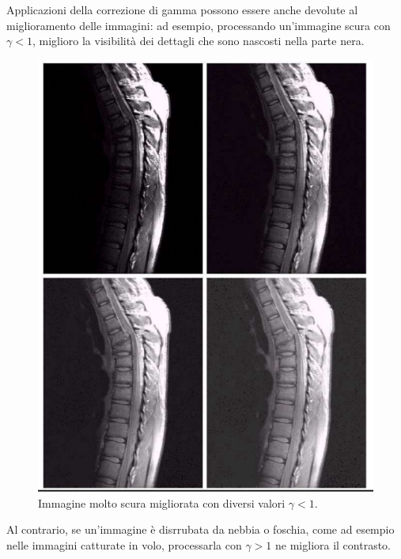 \documentclass[a4paper,11pt]{article}
\begin{document}
Applicazioni della correzione di gamma possono essere anche devolute al miglioramento delle immagini: ad esempio, processando un'immagine scura
con $\gamma < 1$, miglioro la visibilità dei dettagli che sono nascosti nella parte nera.

\renewcommand{\thefigure}{5.10}
\begin{figure}[!h]
  \centering
    \includegraphics[scale=0.5]{images/5/dark_gamma.png}
    \caption{Immagine molto scura migliorata con diversi valori $\gamma < 1$.}
\end{figure}

Al contrario, se un'immagine è disrrubata da nebbia o foschia, come ad esempio nelle immagini catturate in volo, processarla con $\gamma > 1$ ne migliora il contrasto.
\end{document}
